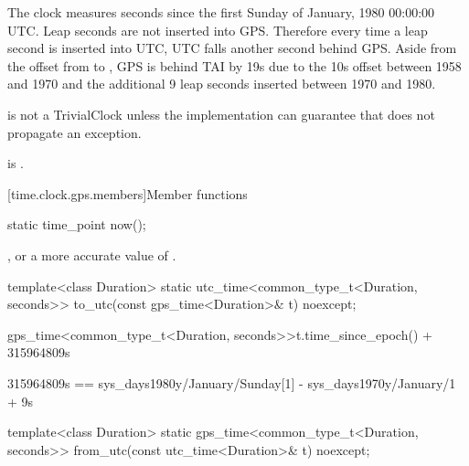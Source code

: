 \pnum
The clock  measures
seconds since the first Sunday of January, 1980 00:00:00 UTC.
Leap seconds are not inserted into GPS.
Therefore every time a leap second is inserted into UTC,
UTC falls another second behind GPS.
Aside from the offset from  to ,
GPS is behind TAI by 19s due to the 10s offset between 1958 and 1970
and the additional 9 leap seconds inserted between 1970 and 1980.

\pnum
{} is not a TrivialClock
unless the implementation can guarantee that
 does not propagate an exception.
\begin{note}
 is .
\end{note}

[time.clock.gps.members]{Member functions}

%
\begin{itemdecl}
static time_point now();
\end{itemdecl}

\begin{itemdescr}
\pnum
\returns {}, or a more accurate value of .
\end{itemdescr}

%
\begin{itemdecl}
template<class Duration>
  static utc_time<common_type_t<Duration, seconds>>
    to_utc(const gps_time<Duration>& t) noexcept;
\end{itemdecl}

\begin{itemdescr}
\pnum
\returns
\begin{codeblock}
gps_time<common_type_t<Duration, seconds>>{t.time_since_epoch()} + 315964809s
\end{codeblock}
\begin{note}
\begin{codeblock}
315964809s == sys_days{1980y/January/Sunday[1]} - sys_days{1970y/January/1} + 9s
\end{codeblock}
\end{note}
\end{itemdescr}

%
\begin{itemdecl}
template<class Duration>
  static gps_time<common_type_t<Duration, seconds>>
    from_utc(const utc_time<Duration>& t) noexcept;
\end{itemdecl}

